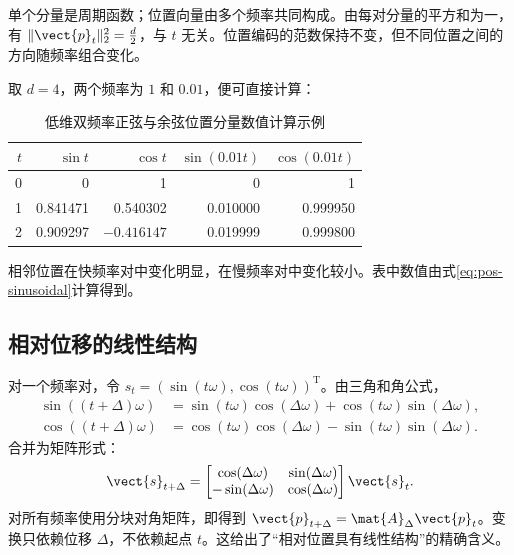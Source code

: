 \documentclass[../textbook.tex]{subfiles}
\begin{document}
单个分量是周期函数；位置向量由多个频率共同构成。由每对分量的平方和为一，有 $\|\vect{p}_t\|_2^2=\frac{d}{2}$，与 $t$ 无关。位置编码的范数保持不变，但不同位置之间的方向随频率组合变化。

取 $d=4$，两个频率为 $1$ 和 $0.01$，便可直接计算：
\begin{table}[htbp]
\centering
\caption{低维双频率正弦与余弦位置分量数值计算示例}\label{tab:pos-sincos-calc}
\begin{tabular}{rrrrr}
\toprule $t$ & $\sin t$ & $\cos t$ & $\sin(0.01t)$ & $\cos(0.01t)$\\\midrule
0 & 0 & 1 & 0 & 1\\
1 & 0.841471 & 0.540302 & 0.010000 & 0.999950\\
2 & 0.909297 & $-0.416147$ & 0.019999 & 0.999800\\
\bottomrule
\end{tabular}
\end{table}
相邻位置在快频率对中变化明显，在慢频率对中变化较小。表中数值由式\eqref{eq:pos-sinusoidal}计算得到。

\subsection{相对位移的线性结构}
对一个频率对，令 $s_t=(\sin(t\omega),\cos(t\omega))^{\mathrm{T}}$。由三角和角公式，
\begin{align}
 \sin((t+\Delta)\omega)
 &=\sin(t\omega)\cos(\Delta\omega)+\cos(t\omega)\sin(\Delta\omega),\\
 \cos((t+\Delta)\omega)
 &=\cos(t\omega)\cos(\Delta\omega)-\sin(t\omega)\sin(\Delta\omega).
\end{align}
合并为矩阵形式：
\begin{equation}
 \vect{s}_{t+\Delta}=
 \begin{bmatrix}\cos(\Delta\omega)&\sin(\Delta\omega)\\
 -\sin(\Delta\omega)&\cos(\Delta\omega)\end{bmatrix}\vect{s}_t.
 \label{eq:pos-sinusoidal-shift}
\end{equation}
对所有频率使用分块对角矩阵，即得到 $\vect{p}_{t+\Delta}=\mat{A}_\Delta \vect{p}_t$。变换只依赖位移 $\Delta$，不依赖起点 $t$。这给出了“相对位置具有线性结构”的精确含义。
\end{document}
